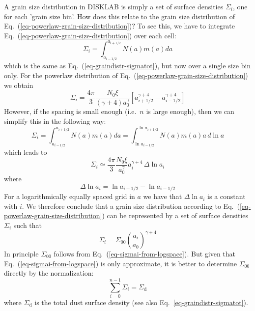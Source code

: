 \documentclass{book}
\begin{document}
A grain size distribution in {\sf DISKLAB} is simply a set of surface densities
$\Sigma_i$, one for each 'grain size bin'. How does this relate to the grain size
distribution of Eq.~(\ref{eq-powerlaw-grain-size-distribution})? To see this, we
have to integrate Eq.~(\ref{eq-powerlaw-grain-size-distribution}) over each cell:
\begin{equation}
\Sigma_{i}=\int_{a_{i-1/2}}^{a_{i+1/2}}N(a)m(a)da
\end{equation}
which is the same as Eq.~(\ref{eq-graindistr-sigmatot}), but now over a single
size bin only. For the powerlaw distribution of Eq.~(\ref{eq-powerlaw-grain-size-distribution})
we obtain
\begin{equation}
  \Sigma_{i} = \frac{4\pi}{3}\frac{N_0\xi}{(\gamma+4)a_0^\gamma}\left[a_{i+1/2}^{\gamma+4}-
    a_{i-1/2}^{\gamma+4}\right]
\end{equation}
However, if the spacing is small enough (i.e.\ $n$ is large enough), then we can
simplify this in the following way:
\begin{equation}
\Sigma_{i}=\int_{a_{i-1/2}}^{a_{i+1/2}}N(a)m(a)da=\int_{\ln a_{i-1/2}}^{\ln a_{i+1/2}}N(a)m(a)a\,d\ln a
\end{equation}
which leads to
\begin{equation}\label{eq-sigmai-from-logspace}
\Sigma_i \simeq \frac{4\pi}{3}\frac{N_0\xi}{a_0^\gamma}a_i^{\gamma+4}\,\Delta\ln a_i
\end{equation}
where
\begin{equation}
\Delta\ln a_i = \ln a_{i+1/2} - \ln a_{i-1/2}
\end{equation}
For a logarithmically equally spaced grid in $a$ we have that $\Delta\ln a_i$ is a
constant with $i$. We therefore conclude that a grain size distribution according
to Eq.~(\ref{eq-powerlaw-grain-size-distribution}) can be represented by a set of
surface densities $\Sigma_i$ such that
\begin{equation}
\Sigma_i = \Sigma_{00} \left(\frac{a_i}{a_0}\right)^{\gamma+4}
\end{equation}
In principle $\Sigma_{00}$ follows from Eq.~(\ref{eq-sigmai-from-logspace}). But given
that Eq.~(\ref{eq-sigmai-from-logspace}) is only approximate, it is better to
determine $\Sigma_{00}$ directly by the normalization:
\begin{equation}
\sum_{i=0}^{n-1} \Sigma_i = \Sigma_{\mathrm{d}}
\end{equation}
where $\Sigma_{\mathrm{d}}$ is the total dust surface density (see also
Eq.~\ref{eq-graindistr-sigmatot}).
\end{document}
